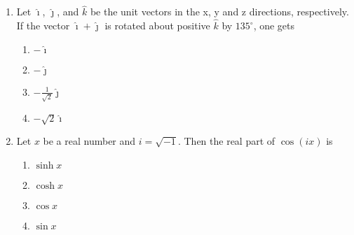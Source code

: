 \documentclass[journal]{IEEEtran}
\begin{document}
\begin{enumerate}
{\begin{multicols}{4}
				\begin{enumerate}
					\item \( y = 2x - 2 \)
					\item \( x = 2y - 1 \)
					\item \( y - 1 = 2(x - 1) \)
					\item \( x - 1 = 2(y - 1) \)
				\end{enumerate}
			\end{multicols}

        
        }
            \item{
        	
        	Let \(\hat{\imath}\), \(\hat{\jmath}\), and \(\hat{k}\) be the unit vectors in the x, y and z directions, respectively. If the vector \(\hat{\imath} + \hat{\jmath}\) is rotated about positive \(\hat{k}\) by \(135^\circ\), one gets
        	\begin{multicols}{4}
        		
        		\begin{enumerate}
        			\item \(-\hat{\imath}\) 
        			\item \(-\hat{\jmath}\) 
        			\item \(-\frac{1}{\sqrt{2}}\hat{\jmath}\) 
        			\item \(-\sqrt{2}\hat{\imath}\)
        		\end{enumerate}
        	\end{multicols}
        	
        	
        }
               \item{
   	
   	Let \( x \) be a real number and \( i = \sqrt{-1} \). Then the real part of \( \cos(ix) \) is
   	\begin{multicols}{4}
   		
   		\begin{enumerate}
   			\item \( \sinh x \)
   			\item \( \cosh x \)
   			\item \( \cos x \)
   			\item \( \sin x \)
   		\end{enumerate}
   	\end{multicols}
   	
   	
   }
    \end{enumerate}
\end{document}
